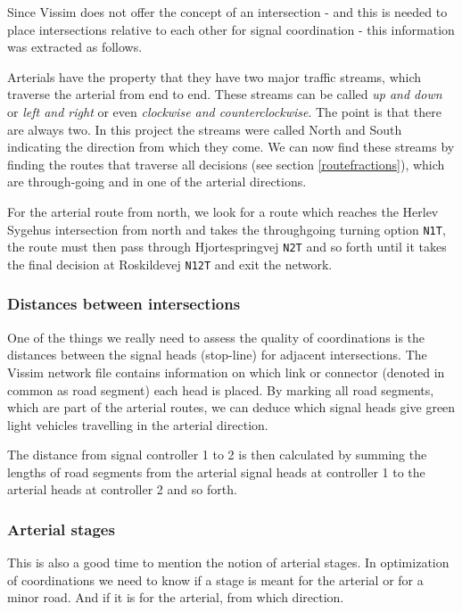 Since Vissim does not offer the concept of an intersection - and this is needed to place intersections relative to each other for signal coordination - this information was extracted as follows.

Arterials have the property that they have two major traffic streams, which traverse the arterial from end to end. These streams can be called \textit{up and down} or \textit{left and right} or even \textit{clockwise and counterclockwise}. The point is that there are always two. In this project the streams were called North and South indicating the direction from which they come. We can now find these streams by finding the routes that traverse all decisions (see section \ref{routefractions}), which are through-going and in one of the arterial directions.

For the arterial route from north, we look for a route which reaches the Herlev Sygehus intersection from north and takes the throughgoing turning option \verb|N1T|, the route must then pass through Hjortespringvej \verb|N2T| and so forth until it takes the final decision at Roskildevej \verb|N12T| and exit the network.

\subsubsection*{Distances between intersections}
One of the things we really need to assess the quality of coordinations is the distances between the signal heads (stop-line) for adjacent intersections. The Vissim network file contains information on which link or connector (denoted in common as road segment) each head is placed. By marking all road segments, which are part of the arterial routes, we can deduce which signal heads give green light vehicles travelling in the arterial direction.

The distance from signal controller 1 to 2 is then calculated by summing the lengths of road segments from the arterial signal heads at controller 1 to the arterial heads at controller 2 and so forth.

\subsubsection*{Arterial stages}
This is also a good time to mention the notion of arterial stages. In optimization of coordinations we need to know if a stage is meant for the arterial or for a minor road. And if it is for the arterial, from which direction.

